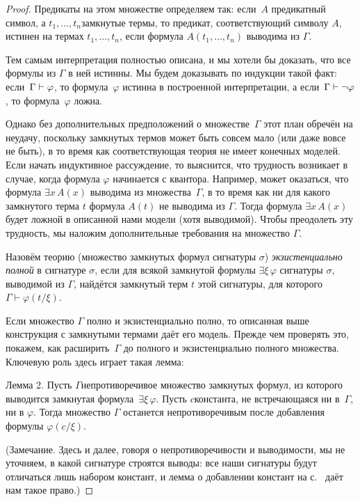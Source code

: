 \begin{proof}
Предикаты на этом множестве определяем так: если~$A$\т
предикатный символ, а $t_1,\dots,t_n$\т замкнутые термы, то
предикат, соответствующий символу $A$, истинен на термах
$t_1,\dots,t_n$, если формула $A(t_1,\dots,t_n)$ выводима из
$\Gamma$.

Тем самым интерпретация полностью описана, и мы хотели бы
доказать, что все формулы из $\Gamma$ в ней истинны. Мы будем
доказывать по индукции такой факт:
если~$\Gamma\hm\vdash\varphi$, то формула~$\varphi$ истинна в
построенной интерпретации, а если~$\Gamma\hm\vdash\lnot\varphi$,
то формула~$\varphi$ ложна.

Однако без дополнительных предположений о множестве~$\Gamma$
этот план обречён на неудачу, поскольку замкнутых термов может
быть совсем мало (или даже вовсе не быть), в то время как
соответствующая теория не имеет конечных моделей. Если начать
индуктивное рассуждение, то выяснится, что трудность возникает в
случае, когда формула $\varphi$ начинается с квантора. Например,
может оказаться, что формула $\exists x\,A(x)$ выводима из
множества~$\Gamma$, в то время как ни для какого замкнутого
терма $t$ формула $A(t)$ не выводима из $\Gamma$. Тогда формула
$\exists x\, A(x)$ будет ложной в описанной нами модели (хотя
выводимой). Чтобы преодолеть эту трудность, мы наложим
дополнительные требования на множество $\Gamma$.

Назовём теорию (множество замкнутых формул сигнатуры $\sigma$)
\emph{экзистенциально полной}%
в сигнатуре $\sigma$,
если для всякой замкнутой формулы $\exists\xi\,\varphi$ сигнатуры
$\sigma$, выводимой из $\Gamma$, найдётся замкнутый терм $t$
этой сигнатуры, для которого $\Gamma\vdash \varphi(t/\xi)$.

Если множество $\Gamma$ полно и экзистенциально полно, то
описанная выше конструкция с замкнутыми термами даёт его модель.
Прежде чем проверять это, покажем, как расширить~$\Gamma$ до
полного и экзистенциально полного множества. Ключевую роль здесь
играет такая лемма:

\textsf{Лемма 2}. Пусть $\Gamma$\т непротиворечивое множество
замкнутых формул, из которого выводится замкнутая
формула~$\exists \xi\,\varphi$. Пусть $c$\т константа, не
встречающаяся ни в~$\Gamma$, ни в $\varphi$. Тогда множество
$\Gamma$ останется непротиворечивым после добавления формулы
$\varphi(c/\xi)$.

(Замечание. Здесь и далее, говоря о непротиворечивости и
выводимости, мы не уточняем, в какой сигнатуре строятся выводы:
все наши сигнатуры будут отличаться лишь набором констант, и
лемма о добавлении констант%
на с.~\pageref{lemma-adding-constants} даёт нам такое право.)


\end{proof}
